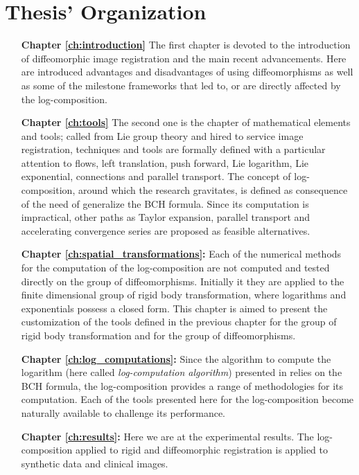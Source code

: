 \section*{Thesis' Organization}
\begin{enumerate}
	\item[{\bf Chapter \ref{ch:introduction}}] The first chapter is devoted to the introduction of diffeomorphic image registration and the main recent advancements. Here are introduced advantages and disadvantages of using diffeomorphisms as well as some of the milestone frameworks that led to, or are directly affected by the log-composition.
	
	\item[{\bf Chapter \ref{ch:tools}}] The second one is the chapter of mathematical elements and tools; called from Lie group theory and hired to service image registration, techniques and tools are formally defined with a particular attention to flows, left translation, push forward, Lie logarithm, Lie exponential, connections and parallel transport. The concept of log-composition, around which the research gravitates, is defined as consequence of the need of generalize the BCH formula. Since its computation is impractical, other paths as Taylor expansion, parallel transport and accelerating convergence series are proposed as feasible alternatives. 
	
	\item[{\bf Chapter \ref{ch:spatial_transformations}:}] Each of the numerical methods for the computation of the log-composition are not computed and tested directly on the group of diffeomorphisms. Initially it they are applied to the finite dimensional group of rigid body transformation, where logarithms and exponentials possess a closed form. This chapter is aimed to present the customization of the tools defined in the previous chapter for the group of rigid body transformation and for the group of diffeomorphisms.
	
	\item[{\bf Chapter \ref{ch:log_computations}:}] Since the algorithm to compute the logarithm (here called \emph{log-computation algorithm}) presented in \cite{Bossa2007} relies on the BCH formula, the log-composition provides a range of methodologies for its computation. Each of the tools presented here for the log-composition become naturally available to challenge its performance.
  
	\item[{\bf Chapter \ref{ch:results}:}] Here we are at the experimental results. The log-composition applied to rigid and diffeomorphic registration is applied to synthetic data and clinical images. \\
	
	
\end{enumerate}









